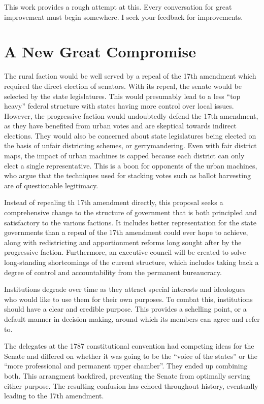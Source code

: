 \documentclass{article}
\newcommand{\quotes}[1]{``#1''}
\begin{document}
This work provides a rough attempt at this. Every conversation for great improvement must begin somewhere. I seek your feedback for improvements.

\section{A New Great Compromise}

The rural faction would be well served by a repeal of the 17th amendment\cite{Tucker}\cite{Virginia} which required the direct election of senators. With its repeal, the senate would be selected by the state legislatures. This would presumably lead to a less \quotes{top heavy} federal structure with states having more control over local issues. However, the progressive faction would undoubtedly defend the 17th amendment, as they have benefited from urban votes and are skeptical towards indirect elections\cite{Smith}. They would also be concerned about state legislatures being elected on the basis of unfair districting schemes, or gerrymandering. Even with fair district maps, the impact of urban machines is capped because each district can only elect a single representative. This is a boon for opponents of the urban machines, who argue that the techniques used for stacking votes such as ballot harvesting are of questionable legitimacy.

Instead of repealing th 17th amendment directly, this proposal seeks a comprehensive change to the structure of government that is both principled and satisfactory to the various factions. It includes better representation for the state governments than a repeal of the 17th amendment could ever hope to achieve, along with redistricting and apportionment reforms long sought after by the progressive faction. Furthermore, an executive council will be created to solve long-standing shortcomings of the current structure, which includes taking back a degree of control and accountability from the permanent bureaucracy.

Institutions degrade over time as they attract special interests and ideologues who would like to use them for their own purposes. To combat this, institutions should have a clear and credible purpose. This provides a schelling point, or a default manner in decision-making, around which its members can agree and refer to\cite{Komoroske}. 

The delegates at the 1787 constitutional convention had competing ideas for the Senate and differed on whether it was going to be the \quotes{voice of the states} or the \quotes{more professional and permanent upper chamber}. They ended up combining both. This arrangment backfired, preventing the Senate from optimally serving either purpose. The resulting confusion has echoed throughout history, eventually leading to the 17th amendment.
\end{document}
